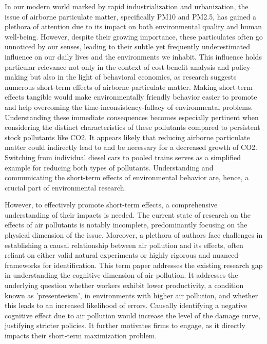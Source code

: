 \documentclass[12pt,a4paper]{article}
\begin{document}
In our modern world marked by rapid industrialization and urbanization, the issue of airborne particulate matter, specifically PM10 and PM2.5, has gained a plethora of attention due to its impact on both environmental quality and human well-being. However, despite their growing importance, these particulates often go unnoticed by our senses, leading to their subtle yet frequently underestimated influence on our daily lives and the environments we inhabit. This influence holds particular relevance not only in the context of cost-benefit analysis and policy-making but also in the light of behavioral economics, as research suggests numerous short-term effects of airborne particulate matter. Making short-term effects tangible would make environmentally friendly behavior easier to promote and help overcoming the time-inconsistency-fallacy of environmental problems. Understanding these immediate consequences becomes especially pertinent when considering the distinct characteristics of these pollutants compared to persistent stock pollutants like CO2. It appears likely that reducing airborne particulate matter could indirectly lead to and be necessary for a decreased growth of CO2. Switching from individual diesel cars to pooled trains serves as a simplified example for reducing both types of pollutants. Understanding and communicating the short-term effects of environmental behavior are, hence, a crucial part of environmental research. 

However, to effectively promote short-term effects, a comprehensive understanding of their impacts is needed. The current state of research on the effects of air pollutants is notably incomplete, predominantly focusing on the physical dimension of the issue. Moreover, a plethora of authors face challenges in establishing a causal relationship between air pollution and its effects, often reliant on either valid natural experiments or highly rigorous and nuanced frameworks for identification. This term paper addresses the existing research gap in understanding the cognitive dimension of air pollution. It addresses the underlying question whether workers exhibit lower productivity, a condition known as 'presenteeism', in environments with higher air pollution, and whether this leads to an increased likelihood of errors. Causally identifying a negative cognitive effect due to air pollution would increase the level of the damage curve, justifying stricter policies. It further motivates firms to engage, as it directly impacts their short-term maximization problem. 
\end{document}
